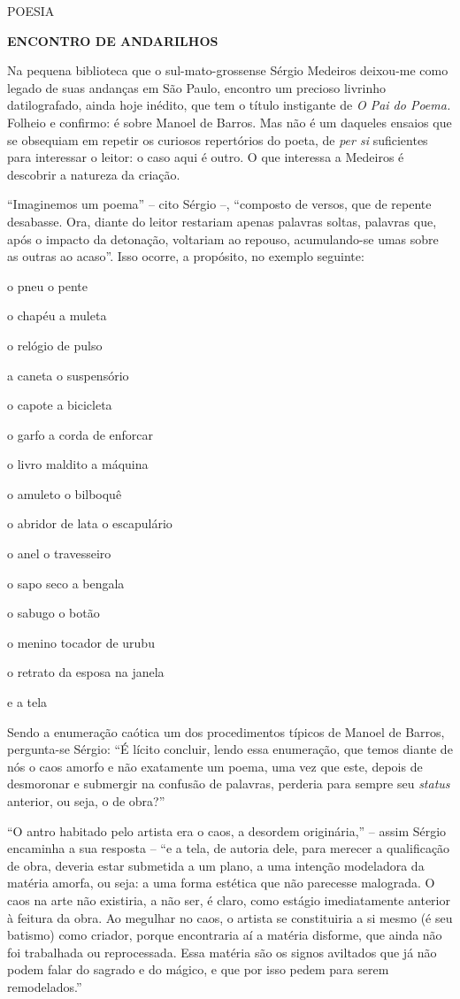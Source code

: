POESIA

\textbf{ENCONTRO DE ANDARILHOS}

Na pequena biblioteca que o sul-mato-grossense Sérgio Medeiros deixou-me
como legado de suas andanças em São Paulo, encontro um precioso livrinho
datilografado, ainda hoje inédito, que tem o título instigante de
\emph{O Pai do Poema.} Folheio e confirmo: é sobre Manoel de Barros. Mas
não é um daqueles ensaios que se obsequiam em repetir os curiosos
repertórios do poeta, de \emph{per si} suficientes para interessar o
leitor: o caso aqui é outro. O que interessa a Medeiros é descobrir a
natureza da criação.

``Imaginemos um poema'' -- cito Sérgio --, ``composto de versos, que de
repente desabasse. Ora, diante do leitor restariam apenas palavras
soltas, palavras que, após o impacto da detonação, voltariam ao repouso,
acumulando-se umas sobre as outras ao acaso''. Isso ocorre, a propósito,
no exemplo seguinte:

o pneu o pente

o chapéu a muleta

o relógio de pulso

a caneta o suspensório

o capote a bicicleta

o garfo a corda de enforcar

o livro maldito a máquina

o amuleto o bilboquê

o abridor de lata o escapulário

o anel o travesseiro

o sapo seco a bengala

o sabugo o botão

o menino tocador de urubu

o retrato da esposa na janela

e a tela

Sendo a enumeração caótica um dos procedimentos típicos de Manoel de
Barros, pergunta-se Sérgio: ``É lícito concluir, lendo essa enumeração,
que temos diante de nós o caos amorfo e não exatamente um poema, uma vez
que este, depois de desmoronar e submergir na confusão de palavras,
perderia para sempre seu \emph{status} anterior, ou seja, o de obra?''

``O antro habitado pelo artista era o caos, a desordem originária,'' --
assim Sérgio encaminha a sua resposta -- ``e a tela, de autoria dele,
para merecer a qualificação de obra, deveria estar submetida a um plano,
a uma intenção modeladora da matéria amorfa, ou seja: a uma forma
estética que não parecesse malograda. O caos na arte não existiria, a
não ser, é claro, como estágio imediatamente anterior à feitura da obra.
Ao megulhar no caos, o artista se constituiria a si mesmo (é seu
batismo) como criador, porque encontraria aí a matéria disforme, que
ainda não foi trabalhada ou reprocessada. Essa matéria são os signos
aviltados que já não podem falar do sagrado e do mágico, e que por isso
pedem para serem remodelados.''

